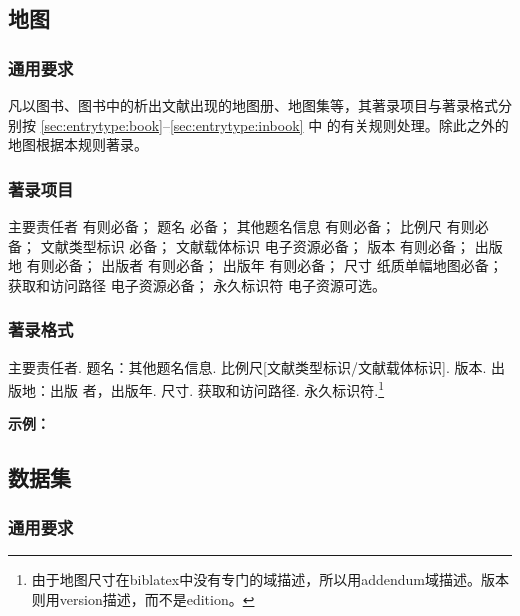 \documentclass[twoside]{article}%
\begin{document}
\subsection{地图}

\subsubsection{通用要求}

凡以图书、图书中的析出文献出现的地图册、地图集等，其著录项目与著录格式分别按 \ref{sec:entrytype:book}--\ref{sec:entrytype:inbook} 中
的有关规则处理。除此之外的地图根据本规则著录。

\subsubsection{著录项目}

主要责任者 有则必备；
题名 必备；
其他题名信息 有则必备；
比例尺 有则必备；
文献类型标识 必备；
文献载体标识 电子资源必备；
版本 有则必备；
出版地 有则必备；
出版者 有则必备；
出版年 有则必备；
尺寸 纸质单幅地图必备；
获取和访问路径 电子资源必备；
永久标识符 电子资源可选。

\subsubsection{著录格式}

主要责任者. 题名：其他题名信息. 比例尺[文献类型标识/文献载体标识]. 版本. 出版地：出版
者，出版年. 尺寸. 获取和访问路径. 永久标识符.\footnote{由于地图尺寸在biblatex中没有专门的域描述，所以用addendum域描述。版本则用version描述，而不是edition。}



\begin{refsection}
\nocite{胡健民2021--,刘祥沈2016地图,中工武大2019地图,吴自银2019地图,国家测绘2016地图,
訾冬梅2006地图,谭其骧1982地图,童世亨1926地图,CRIBB2015map}


\textbf{示例：}

{\printbibliography[heading=none,env=indentegenv]}

\end{refsection}


\subsection{数据集}\label{sec:entrytype:dataset}

\subsubsection{通用要求}
\end{document}
